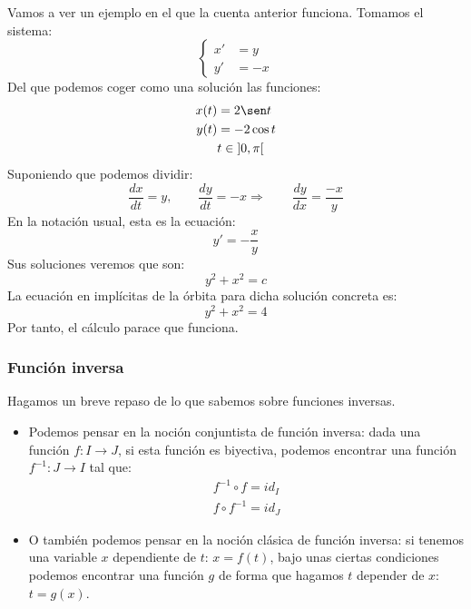 \begin{ejemplo}
    Vamos a ver un ejemplo en el que la cuenta anterior funciona. Tomamos el sistema:
    \begin{equation*}
        \left\{\begin{array}{lr}
                x' &= y \\
                y' &= -x
        \end{array}\right.
    \end{equation*}
    Del que podemos coger como una solución las funciones:
    \begin{align*}
        x(t) &= 2\sen t \\
        y(t) &= -2\cos t \\
             & t\in \left]0,\pi\right[
    \end{align*}
    Suponiendo que podemos dividir:
    \begin{equation*}
        \dfrac{dx}{dt} = y,\qquad \dfrac{dy}{dt} = -x\Longrightarrow  \qquad \dfrac{dy}{dx} = \dfrac{-x}{y}
    \end{equation*}
    En la notación usual, esta es la ecuación:
    \begin{equation*}
        y' = -\dfrac{x}{y}
    \end{equation*}
    Sus soluciones veremos que son:
    \begin{equation*}
        y^2 + x^2 = c
    \end{equation*}
    La ecuación en implícitas de la órbita para dicha solución concreta es:
    \begin{equation*}
        y^2 + x^2 = 4
    \end{equation*}
    Por tanto, el cálculo parace que funciona.
\end{ejemplo}

\subsubsection{Función inversa}
Hagamos un breve repaso de lo que sabemos sobre funciones inversas. 
\begin{itemize}
    \item Podemos pensar en la noción conjuntista de función inversa: dada una función $f:I\rightarrow J$, si esta función es biyectiva, podemos encontrar una función ${f^{-1}:J\rightarrow I}$ tal que:
        \begin{gather*}
            f^{-1}\circ f = id_I \\
            f\circ f^{-1} = id_J
        \end{gather*}
    \item O también podemos pensar en la noción clásica de función inversa: si tenemos una variable $x$ dependiente de $t$: $x = f(t)$, bajo unas ciertas condiciones podemos encontrar una función $g$ de forma que hagamos $t$ depender de $x$: $t = g(x)$.
\end{itemize}

